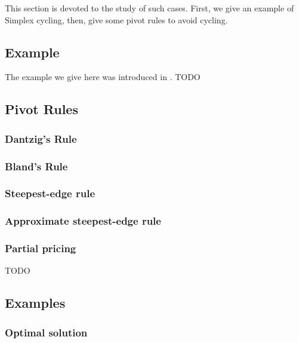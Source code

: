 This section is devoted to the study of such cases. First, we give an example of Simplex cycling, then, give some pivot rules to avoid cycling.

\subsection{Example}

The example we give here was introduced in \cite{gollinear}. 
TODO

\subsection{Pivot Rules}
\subsubsection{Dantzig's Rule}
\subsubsection{Bland's Rule}
\subsubsection{Steepest-edge rule}
\subsubsection{Approximate steepest-edge rule}
\subsubsection{Partial pricing}

TODO

\subsection{Examples}
\subsubsection{Optimal solution}

